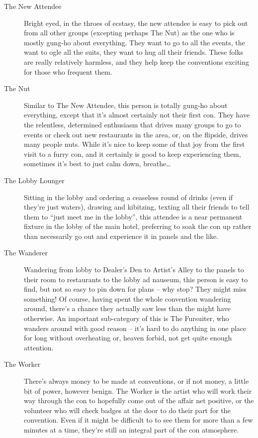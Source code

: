 \begin{description}
  \item[The New Attendee] Bright eyed, in the throes of ecstasy, the new attendee is easy to pick out from all other groups (excepting perhaps The Nut) as the one who is mostly gung-ho about everything.  They want to go to all the events, the want to ogle all the suits, they want to hug all their friends.  These folks are really relatively harmless, and they help keep the conventions exciting for those who frequent them.
  \item[The Nut] Similar to The New Attendee, this person is totally gung-ho about everything, except that it's almost certainly not their first con.  They have the relentless, determined enthusiasm that drives many groups to go to events or check out new restaurants in the area, or, on the flipside, drives many people nuts.  While it's nice to keep some of that joy from the first visit to a furry con, and it certainly is good to keep experiencing them, sometimes it's best to just calm down, breathe\ldots
  \item[The Lobby Lounger] Sitting in the lobby and ordering a ceaseless round of drinks (even if they're just waters), drawing and kibitzing, texting all their friends to tell them to “just meet me in the lobby”, this attendee is a near permanent fixture in the lobby of the main hotel, preferring to soak the con up rather than necessarily go out and experience it in panels and the like.
  \item[The Wanderer] Wandering from lobby to Dealer's Den to Artist's Alley to the panels to their room to restaurants to the lobby ad nauseum, this person is easy to find, but not so easy to pin down for plans -- why stop? They might miss something!  Of course, having spent the whole convention wandering around, there's a chance they actually saw less than the might have otherwise.  An important sub-category of this is The Fursuiter, who wanders around with good reason -- it's hard to do anything in one place for long without overheating or, heaven forbid, not get quite enough attention.
  \item[The Worker] There's always money to be made at conventions, or if not money, a little bit of power, however benign.  The Worker is the artist who will work their way through the con to hopefully come out of the affair net positive, or the volunteer who will check badges at the door to do their part for the convention.  Even if it might be difficult to to see them for more than a few minutes at a time, they're still an integral part of the con atmosphere.
\end{description}


